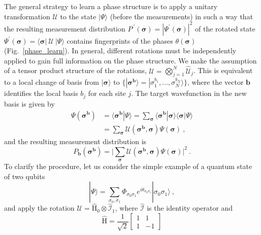 \documentclass[submission, Phys, hidelinks]{SciPost}
\begin{document}
The general strategy to learn a phase structure is to apply a unitary transformation $\bm{\mathcal{U}}$ to the state $|\Psi\rangle$ (before the measurements) in such a way that the resulting measurement distribution $P^{\:\prime}(\bm{\sigma})=|\Psi^\prime(\bm{\sigma})|^2$ of the rotated state $\Psi^\prime(\bm{\sigma})=\langle\bm{\sigma}|\:\bm{\mathcal{U}}\:|\Psi\rangle$ contains fingerprints of the phases $\theta(\bm{\sigma})$ (Fig.~\ref{phase_learn}). In general, different rotations must be independently applied to gain full information on the phase structure. We make the assumption of a tensor product structure of the rotations, $\bm{\mathcal{U}}=\bigotimes_{j=1}^N\hat{\mathcal{U}}_j$. This is equivalent to a local change of basis from $|\bm{\sigma}\rangle$ to $\{|\bm{\sigma}^{\bm{b}}\rangle=|\sigma_1^{b_1},\dots,\sigma_N^{b_N}\rangle\}$, where the vector $\bm{b}$ identifies the local basis $b_j$ for each site $j$. The target wavefunction in the new basis is given by
\begin{equation}
\begin{split}
	\Psi(\bm{\sigma}^{\bm{b}})
	&=\langle \bm{\sigma}^{\bm{b}}|\Psi\rangle=\sum_{\bm{\sigma}}\langle \bm{\sigma}^{\bm{b}}|\bm{\sigma}\rangle\langle\bm{\sigma}|\Psi\rangle\\
	&=\sum_{\bm{\sigma}}\mathcal{U}(\bm{\sigma}^{\bm{b}},\bm{\sigma})\Psi(\bm{\sigma})\:,
\end{split}
\end{equation}
and the resulting measurement distribution is
\begin{equation}
	P_{\bm{b}}(\bm{\sigma}^{\bm{b}})=\bigg|\sum_{\bm{\sigma}}\mathcal{U}(\bm{\sigma}^{\bm{b}},\bm{\sigma})\Psi(\bm{\sigma})\bigg|^2\:.
\end{equation}
To clarify the procedure, let us consider the simple example of a quantum state of two qubits
\begin{equation}
	|\Psi\rangle=\sum_{\sigma_0,\sigma_1}\Phi_{\sigma_0\sigma_1}e^{i\theta_{\sigma_0\sigma_1}}|\sigma_0\sigma_1\rangle\:,
\end{equation}
and apply the rotation $\bm{\mathcal{U}}=\hat{\mathrm{H}}_0\otimes\hat{\mathcal{I}}_1$, where $\hat{\mathcal{I}}$ is the identity operator and 
\begin{equation}
	\hat{\mathrm{H}}=\frac{1}{\sqrt{2}}\begin{bmatrix}1 & 1\\
1 & -1
\end{bmatrix}
\end{equation}
\end{document}
